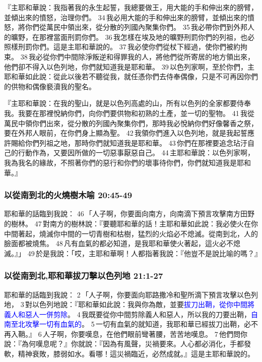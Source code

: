 『主耶和華說：我指著我的永生起誓，我總要做王，用大能的手和伸出來的膀臂，並傾出來的憤怒，治理你們。 34 我必用大能的手和伸出來的膀臂，並傾出來的憤怒，將你們從萬民中領出來，從分散的列國內聚集你們。 35 我必帶你們到外邦人的曠野，在那裡當面刑罰你們。 36 我怎樣在埃及地的曠野刑罰你們的列祖，也必照樣刑罰你們。這是主耶和華說的。 37 我必使你們從杖下經過，使你們被約拘束。 38 我必從你們中間除淨叛逆和得罪我的人，將他們從所寄居的地方領出來，他們卻不得入以色列地，你們就知道我是耶和華。 39 以色列家啊，至於你們，主耶和華如此說：從此以後若不聽從我，就任憑你們去侍奉偶像，只是不可再因你們的供物和偶像褻瀆我的聖名。

『主耶和華說：在我的聖山，就是以色列高處的山，所有以色列的全家都要侍奉我。我要在那裡悅納你們，向你們要供物和初熟的土產，並一切的聖物。 41 我從萬民中領你們出來，從分散的列國內聚集你們，那時我必悅納你們好像馨香之祭，要在外邦人眼前，在你們身上顯為聖。 42 我領你們進入以色列地，就是我起誓應許賜給你們列祖之地，那時你們就知道我是耶和華。 43 你們在那裡要追念玷汙自己的行動作為，又要因所做的一切惡事厭惡自己。 44 主耶和華說：以色列家啊，我為我名的緣故，不照著你們的惡行和你們的壞事待你們，你們就知道我是耶和華。』

\subsubsection{以從南到北的火燒樹木喻 20:45-49}
耶和華的話臨到我說： 46 「人子啊，你要面向南方，向南滴下預言攻擊南方田野的樹林。 47 對南方的樹林說：『要聽耶和華的話！主耶和華如此說：我必使火在你中間著起，燒滅你中間的一切青樹和枯樹，猛烈的火焰必不熄滅。從南到北，人的臉面都被燒焦。 48 凡有血氣的都必知道，是我耶和華使火著起，這火必不熄滅。』」 49 於是我說：「哎，主耶和華啊！人都指著我說：『他豈不是說比喻的嗎？』

\subsubsection{以從南到北,耶和華拔刀擊以色列地 21:1-27}
耶和華的話臨到我說： 2 「人子啊，你要面向耶路撒冷和聖所滴下預言攻擊以色列地， 3 對以色列地說：『耶和華如此說：我與你為敵，並要\textcolor{blue}{拔刀出鞘，從你中間將義人和惡人一併剪除}。 4 我既要從你中間剪除義人和惡人，所以我的刀要出鞘，\textcolor{blue}{自南至北攻擊一切有血氣的}。 5 一切有血氣的就知道，我耶和華已經拔刀出鞘，必不再入鞘。』 6 人子啊，你要嘆息，在他們眼前彎著腰，苦苦地嘆息。 7 他們問你說：『為何嘆息呢？』你就說：『因為有風聲，災禍要來。人心都必消化，手都發軟，精神衰敗，膝弱如水。看哪！這災禍臨近，必然成就。』這是主耶和華說的。

